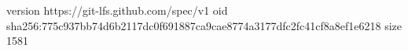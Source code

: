 version https://git-lfs.github.com/spec/v1
oid sha256:775c937bb74d6b2117dc0f691887ca9cae8774a3177dfc2fc41cf8a8ef1e6218
size 1581
